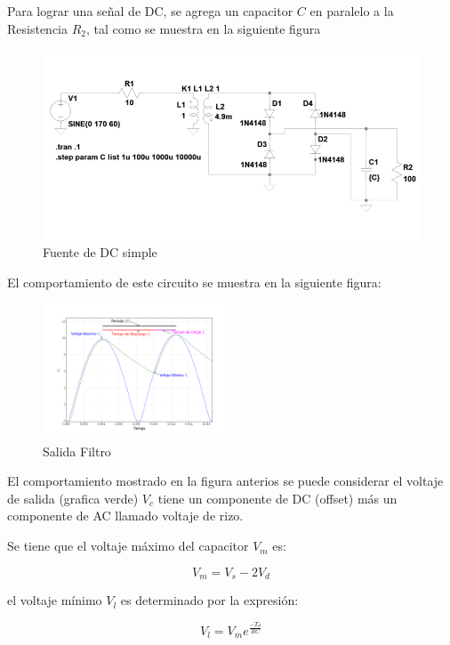 \documentclass{article}
\begin{document}
    Para lograr una señal de DC, se agrega un capacitor $C$ en paralelo a la
Resistencia $R_{2}$, tal como se muestra en la siguiente figura

\begin{figure}[htbp]
\centering
\includegraphics{images/fuentesimple.png}
\caption{Fuente de DC simple}
\end{figure}

El comportamiento de este circuito se muestra en la siguiente figura:

\begin{figure}[htbp]
\centering
\includegraphics[width=0.5\textwidth]{images/filtrofuentedc.png}
\caption{Salida Filtro}
\end{figure}

El comportamiento mostrado en la figura anterios se puede considerar el
voltaje de salida (grafica verde) $V_{c}$ tiene un componente de DC
(offset) más un componente de AC llamado voltaje de rizo.

Se tiene que el voltaje máximo del capacitor $V_{m}$ es:

\begin{equation}\label{eq:vm}
V_{m}=V_{s}-2V_{d}
\end{equation}

el voltaje mínimo $V_{l}$ es determinado por la expresión:

\begin{equation}\label{eq:vl}
V_{l}=V_{m}e^{\frac{-T_{d}}{RC}}
\end{equation}
\end{document}
